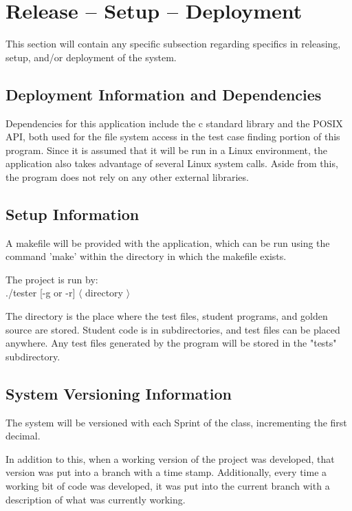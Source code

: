 
\chapter{Release -- Setup -- Deployment}
This section will contain any specific subsection regarding specifics in releasing, 
setup, and/or deployment of the system. 


\section{Deployment Information and Dependencies}
Dependencies for this application include the c standard library and the POSIX API, both used for the
file system access in the test case finding portion of this program. Since it is assumed that it will be run
in a Linux environment, the application also takes advantage of several Linux system calls. Aside from this,
the program does not rely on any other external libraries.



\section{Setup Information}
A makefile will be provided with the application, which can be run using the command 'make' within the 
directory in which the makefile exists.

The project is run by: \\
./tester [-g or -r] $\langle$ directory $\rangle$

The directory is the place where the test files, student programs, and golden source are stored. Student code is in subdirectories, and test files can be placed anywhere. Any test files generated by the program will be stored in the "tests" subdirectory.


\section{System  Versioning Information}
The system will be versioned with each Sprint of the class, incrementing the first decimal.

In addition to this, when a working version of the project was developed, that version was put into a branch with a time stamp. 
Additionally, every time a working bit of code was developed, it was put into the current branch with 
a description of what was currently working.

